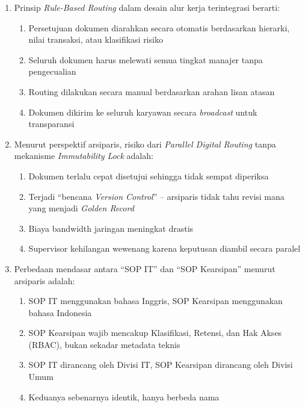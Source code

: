 \documentclass[12pt,a4paper]{report}
\begin{document}
\begin{enumerate}[leftmargin=*, itemsep=0.5cm]
\item Prinsip \textit{Rule-Based Routing} dalam desain alur kerja terintegrasi berarti:
\begin{enumerate}[label=\Alph*., nosep]
    \item Persetujuan dokumen diarahkan secara otomatis berdasarkan hierarki, nilai transaksi, atau klasifikasi risiko
    \item Seluruh dokumen harus melewati semua tingkat manajer tanpa pengecualian
    \item Routing dilakukan secara manual berdasarkan arahan lisan atasan
    \item Dokumen dikirim ke seluruh karyawan secara \textit{broadcast} untuk transparansi
\end{enumerate}

\item Menurut perspektif arsiparis, risiko dari \textit{Parallel Digital Routing} tanpa mekanisme \textit{Immutability Lock} adalah:
\begin{enumerate}[label=\Alph*., nosep]
    \item Dokumen terlalu cepat disetujui sehingga tidak sempat diperiksa
    \item Terjadi ``bencana \textit{Version Control}'' -- arsiparis tidak tahu revisi mana yang menjadi \textit{Golden Record}
    \item Biaya bandwidth jaringan meningkat drastis
    \item Supervisor kehilangan wewenang karena keputusan diambil secara paralel
\end{enumerate}

\item Perbedaan mendasar antara ``SOP IT'' dan ``SOP Kearsipan'' menurut arsiparis adalah:
\begin{enumerate}[label=\Alph*., nosep]
    \item SOP IT menggunakan bahasa Inggris, SOP Kearsipan menggunakan bahasa Indonesia
    \item SOP Kearsipan wajib mencakup Klasifikasi, Retensi, dan Hak Akses (RBAC), bukan sekadar metadata teknis
    \item SOP IT dirancang oleh Divisi IT, SOP Kearsipan dirancang oleh Divisi Umum
    \item Keduanya sebenarnya identik, hanya berbeda nama
\end{enumerate}


\end{enumerate}
\end{document}
